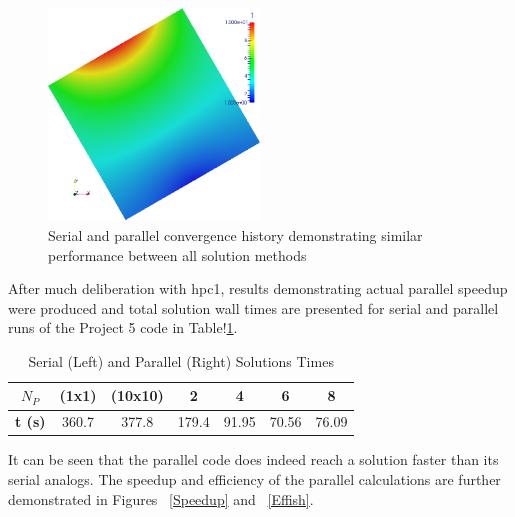 \documentclass[twocolumn,10pt]{asme2ej}
\begin{document}
\begin{figure}[htb]
\begin{center}
\includegraphics[width=0.5\textwidth]{../Results/np4_nx501_n10_m10/Composite.png}
\caption{Serial and parallel convergence history demonstrating similar performance between all solution methods}
\label{Temp}
\end{center}
\end{figure}

After much deliberation with hpc1, results demonstrating actual parallel speedup were produced and total solution wall times are presented for serial and parallel runs of the Project 5 code in Table!\ref{Times}.


\vspace{-1.8em}
\begin{table}[htb]
\begin{center}
\caption{Serial (Left) and Parallel (Right) Solutions Times}
\begin{tabular}{|c |c c | c c c c|}
\hline
\textbf{$N_P$} &(1x1) & (10x10) &  2 & 4 & 6  & 8     \\
\hline
 \textbf{t (s)} &360.7  & 377.8 & 179.4 & 91.95 & 70.56 & 76.09 \\
\hline
\end{tabular}
\label{Times}
\end{center}
\end{table}
\vspace{-2.3em}

It can be seen that the parallel code does indeed reach a solution faster than its serial analogs.  The speedup and efficiency of the parallel calculations are further demonstrated in Figures ~\ref{Speedup} and ~\ref{Effish}.
\end{document}
